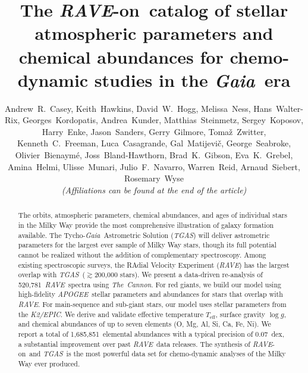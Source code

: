 \documentclass[preprint]{aastex}
\newcommand{\acronym}[1]{{\small{#1}}}
\newcommand{\project}[1]{\textsl{#1}}
\newcommand{\gaia}{\project{Gaia}}
\newcommand{\thecannon}{\project{The~Cannon}}
\newcommand{\rave}{\project{\acronym{RAVE}}}
\newcommand{\apogee}{\project{\acronym{APOGEE}}}
\newcommand{\epic}{\project{K2/EPIC}}
\newcommand{\tgas}{\project{\acronym{TGAS}}}
\newcommand{\raveon}{\rave-on}
\newcommand{\teff}{T_{\mathrm{eff}}}
\newcommand{\logg}{\log g}
\newcommand{\Nspectra}{520,781}
\newcommand{\ReportedAbundances}{1,685,851} %
\begin{document}
\title{The \raveon\ catalog of stellar atmospheric parameters and\\
chemical abundances for chemo-dynamic studies in the \gaia\ era}

\author{
Andrew~R.~Casey,
Keith~Hawkins,
David~W.~Hogg,
Melissa~Ness,
Hans~Walter-Rix,
Georges~Kordopatis,
Andrea~Kunder,
Matthias~Steinmetz,
Sergey~Koposov,
Harry~Enke,
Jason~Sanders,
Gerry~Gilmore,
Toma\v{z}~Zwitter,
Kenneth~C.~Freeman,
Luca~Casagrande,
Gal~Matijevi\v{c},
George~Seabroke,
Olivier~Bienaym\'e,
Joss~Bland-Hawthorn,
Brad~K.~Gibson,
Eva~K.~Grebel,
Amina~Helmi,
Ulisse~Munari,
Julio~F.~Navarro,
Warren~Reid,
Arnaud~Siebert,
Rosemary~Wyse\\
\vspace{2em}
\emph{(Affiliations can be found at the end of the article)}
}


\begin{abstract}
The orbits, atmospheric parameters, chemical abundances, and ages of 
individual stars in the Milky Way provide the most comprehensive 
illustration of galaxy formation available.  The Tycho-\gaia\ 
Astrometric Solution (\tgas) will deliver astrometric parameters for
the largest ever sample of Milky Way stars, though its full potential
cannot be realized without the addition of complementary spectroscopy.  
Among existing spectroscopic surveys, the RAdial Velocity Experiment 
(\rave) has the largest overlap with \tgas\ ($\gtrsim$200,000 stars).  
We present a data-driven re-analysis of \Nspectra\ \rave\ spectra using 
\thecannon.  For red giants, we build our model using high-fidelity 
\apogee\ stellar parameters and abundances for stars that overlap 
with \rave.  For main-sequence and sub-giant stars, our model uses 
stellar parameters from the \epic.  We derive and validate 
effective temperature $\teff$, surface gravity $\logg$, and chemical 
abundances of up to seven elements (O, Mg, Al, Si, Ca, Fe, Ni).  We 
report a total of \ReportedAbundances\ elemental abundances with a 
typical precision of 0.07~dex, a substantial improvement over past 
\rave\ data releases.  The synthesis of \raveon\ and \tgas\ is the 
most powerful data set for chemo-dynamic analyses of the Milky Way ever produced.
\end{abstract}
\end{document}
